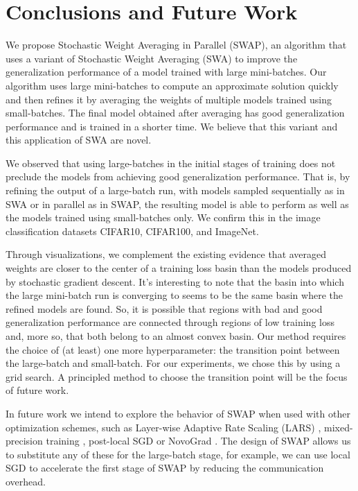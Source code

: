 \documentclass{article} %
\begin{document}
\section{Conclusions and Future Work}
\vspace{-0.1in}

We propose Stochastic Weight Averaging in Parallel (SWAP), an algorithm that
uses a variant of Stochastic Weight Averaging (SWA) to improve the
generalization performance of a model trained with large mini-batches. Our
algorithm uses large mini-batches to compute an approximate solution quickly
and then refines it by averaging the weights of multiple models trained using small-batches. The final model obtained after averaging has good generalization performance and is trained in a shorter time. We believe that this variant 
and this application of SWA are novel.

We observed that using large-batches in the initial stages of training does not
preclude the models from achieving good generalization performance. That is, by
refining the output of a large-batch run, with models sampled sequentially as
in SWA or in parallel as in SWAP, the resulting model is able to perform as well
as the models trained using small-batches only. We confirm this in the image 
classification datasets CIFAR10, CIFAR100, and ImageNet. 

Through visualizations, we complement the existing evidence that averaged
weights are closer to the center of a training loss basin than the models
produced by stochastic gradient descent. It's interesting to note that the
basin into which the large mini-batch run is converging to seems to be the same
basin where the refined models are found. So, it is possible that regions with
bad and good generalization performance are connected through regions of low
training loss and, more so, that both belong to an almost convex basin.
Our method requires the choice of (at least) one more hyperparameter: the
transition point between the large-batch and small-batch. For our experiments,
we chose this by using a grid search. A principled method to choose the
transition point will be the focus of future work.

In future work we intend to explore the behavior of SWAP when used with other optimization schemes, such as Layer-wise Adaptive Rate Scaling (LARS) \citep{you2017scalingImagenet32k}, mixed-precision training \cite{imagenet4mins:2018}, post-local SGD \citep{post_local_sgd} or NovoGrad \citep{novograd}. The design of SWAP allows us to substitute any of these for the large-batch stage, for example, we can use local SGD to accelerate the first stage of SWAP by reducing the communication overhead.
\end{document}
